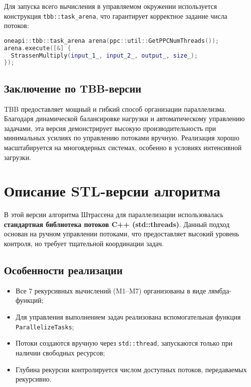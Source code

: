 \documentclass[14pt,a4paper]{extarticle}
\begin{document}
Для запуска всего вычисления в управляемом окружении используется конструкция \texttt{tbb::task\_arena}, что гарантирует корректное задание числа потоков:

\begin{lstlisting}[language=C++]
oneapi::tbb::task_arena arena(ppc::util::GetPPCNumThreads());
arena.execute([&] {
  StrassenMultiply(input_1_, input_2_, output_, size_);
});
\end{lstlisting}

\subsection*{Заключение по TBB-версии}

TBB предоставляет мощный и гибкий способ организации параллелизма. Благодаря динамической балансировке нагрузки и автоматическому управлению задачами, эта версия демонстрирует высокую производительность при минимальных усилиях по управлению потоками вручную. Реализация хорошо масштабируется на многоядерных системах, особенно в условиях интенсивной загрузки.

\newpage
\section{Описание STL-версии алгоритма}

В этой версии алгоритма Штрассена для параллелизации использовалась \textbf{стандартная библиотека потоков C++ (std::threads)}. Данный подход основан на ручном управлении потоками, что предоставляет высокий уровень контроля, но требует тщательной координации задач.

\subsection*{Особенности реализации}

\begin{itemize}
    \item Все 7 рекурсивных вычислений (M1–M7) организованы в виде лямбда-функций;
    \item Для управления выполнением задач реализована вспомогательная функция \texttt{ParallelizeTasks};
    \item Потоки создаются вручную через \texttt{std::thread}, запускаются только при наличии свободных ресурсов;
    \item Глубина рекурсии контролируется числом доступных потоков, передаваемых рекурсивно.
\end{itemize}
\end{document}
